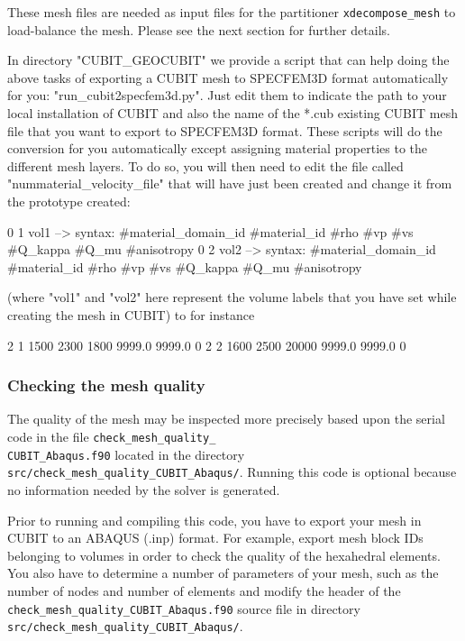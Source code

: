 These mesh files are needed as input files for the partitioner \texttt{xdecompose\_mesh}
to load-balance the mesh. Please see the next section for further
details.

In directory "CUBIT\_GEOCUBIT" we provide a script that can help doing the above tasks of exporting a CUBIT mesh
to SPECFEM3D format automatically for you: "run\_cubit2specfem3d.py".
Just edit them to indicate the path to your local installation of CUBIT and also the name of the *.cub existing CUBIT mesh file
that you want to export to SPECFEM3D format. These scripts will do the conversion for you automatically except assigning material properties
to the different mesh layers. To do so, you will then need to edit the file
called "nummaterial\_velocity\_file" that will have just been created and change it from the prototype created:

    0 1 vol1 --> syntax: \#material\_domain\_id \#material\_id \#rho \#vp \#vs \#Q\_kappa \#Q\_mu \#anisotropy
    0 2 vol2 --> syntax: \#material\_domain\_id \#material\_id \#rho \#vp \#vs \#Q\_kappa \#Q\_mu \#anisotropy

(where "vol1" and "vol2" here represent the volume labels that you have set while creating the mesh in CUBIT)
to for instance

    2 1 1500 2300 1800 9999.0 9999.0 0
    2 2 1600 2500 20000 9999.0 9999.0 0


\subsubsection*{Checking the mesh quality}

The quality of the mesh may be inspected more precisely based upon
the serial code in the file \texttt{check\_mesh\_quality\_}~\\
 \texttt{CUBIT\_Abaqus.f90} located in the directory \texttt{src/check\_mesh\_quality\_CUBIT\_Abaqus/}.
Running this code is optional because no information needed by the
solver is generated.

Prior to running and compiling this code, you have to export your
mesh in CUBIT to an ABAQUS (.inp) format. For example, export mesh
block IDs belonging to volumes in order to check the quality of the
hexahedral elements. You also have to determine a number of parameters
of your mesh, such as the number of nodes and number of elements and
modify the header of the \texttt{check\_mesh\_quality\_CUBIT\_Abaqus.f90}
source file in directory \texttt{src/check\_mesh\_quality\_CUBIT\_Abaqus/}.

